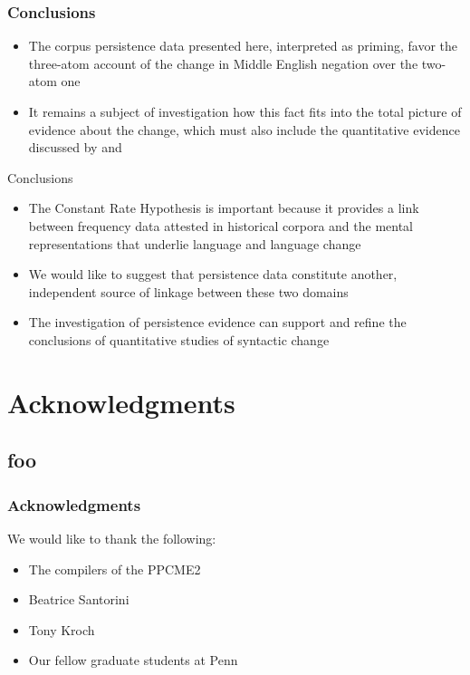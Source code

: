 \documentclass{digs-slides}
\begin{document}
\begin{frame}
    \frametitle{Conclusions}
    \begin{itemize}
      \item The corpus persistence data presented here, interpreted as
        priming, favor the three-atom account of the change in Middle
        English negation over the two-atom one

      \item It remains a subject of investigation how this fact fits
        into the total picture of evidence about the change, which must
        also include the quantitative evidence discussed by
        \textcite{Frisch1997} and \textcite{wallage08}
    \end{itemize}
\end{frame}

\begin{frame}{Conclusions}
    \begin{itemize}
      \item The Constant Rate Hypothesis is important because it
        provides a link between frequency data attested in historical
        corpora and the mental representations that underlie language
        and language change
      \item We would like to suggest that persistence data constitute
        another, independent source of linkage between these two domains
      \item The investigation of persistence evidence can support and refine
        the conclusions of quantitative studies of syntactic change
    \end{itemize}
\end{frame}

\appendix{}

\section{Acknowledgments}

\subsection{foo}

\begin{frame}
    \frametitle{Acknowledgments}
    We would like to thank the following:
    \begin{itemize}
      \item The compilers of the PPCME2
      \item Beatrice Santorini
      \item Tony Kroch
      \item Our fellow graduate students at Penn
    \end{itemize}
\end{frame}
\end{document}
